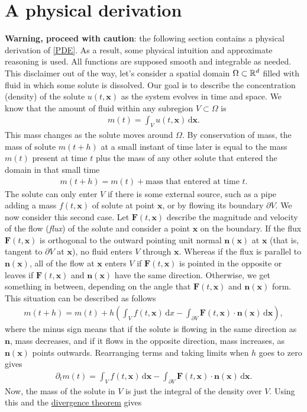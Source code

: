 \documentclass[
	a4paper,
	DIV=14,
	abstract=true,
	numbers=noenddot
]
{scrartcl}
\theoremstyle{definition}
\newcommand{\qt}[1]{\left(#1\right)}
\renewcommand{\d}{\,\mathrm{d}}\newcommand{\dx}{\,\mathrm{d}x}\newcommand{\dy}{\,\mathrm{d}y}
\begin{document}
\section{A physical derivation}
\textbf{Warning, proceed with caution}: the following section contains a physical derivation of  \eqref{PDE}. As a result, some physical intuition and approximate reasoning is used. All functions are supposed smooth and integrable as needed.
This disclaimer out of the way, let's consider a spatial domain $\Omega \subset \mathbb{R}^d$ filled with fluid in which some solute is dissolved. Our goal is to describe the concentration (density) of the solute $u(t,\bm{x}) $ as the system evolves in time and space. We know that the amount of fluid within any subregion $V \subset  \Omega$ is
\begin{align*}
	m(t)=\int_{V} u(t,\bm{x}) \d \bm{x}  .
\end{align*}
This mass changes as the solute moves around $\Omega$.	By conservation of mass, the mass of solute $m(t+h)$ at a small instant of time later is equal to the mass $m(t)$ present at time $t$ plus the mass of any other solute that entered the domain in that small time
\begin{align*}
	m(t+h)=m(t)+ \text{mass that entered at time } t .
\end{align*}
The solute can only enter $V$ if there is some external source, such as a pipe adding a mass $f(t,\bm{x})$ of solute at point $\bm{x}$, or by flowing its boundary  $\partial V$. We now consider this second case. Let $\bm{F}(t,\bm{x} ) $ describe the magnitude and velocity of the flow (\emph{flux}) of the solute and consider a point $\bm{x}$ on the boundary. If the flux $\bm{F}(t,\bm{x} )$ is orthogonal to the outward pointing unit normal $\bm{n}(\bm{x})$ at $\bm{x}$ (that is, tangent to $\partial  V$ at $\bm{x}$), no fluid enters $V$ through $\bm{x}$. Whereas if the flux is parallel to $\bm{n}(\bm{x})$, all of the flow at $\bm{x} $ enters $V$ if $\bm{F}(t,\bm{x})$ is pointed in the opposite or leaves if $\bm{F}(t,\bm{x})$ and $\bm{n}(\bm{x})$ have the same direction. Otherwise, we get something in between, depending on the angle that $\bm{F}(t,\bm{x})$ and $\bm{n}(\bm{x})$ form. This situation can be described as follows
\begin{align*}
	m(t+h)=m(t) +h \qt{ \int_{V} f(t,\bm{x} ) \dx- \int_{\partial V} \bm{F}(t, \bm{x})\cdot \bm{n}(\bm{x} )    \d  \bm{x}  },
\end{align*}
where the minus sign means that if the solute is flowing in the same direction as $\bm{n}$, mass decreases, and if it flows in the opposite direction, mass increases, as $ \bm{n}(\bm{x})$ points outwards. Rearranging terms and taking limits when $h$ goes to zero gives
\begin{align*}
	\partial _t m(t)=\int_{V}f(t,\bm{x} ) \d \bm{x}   -\int_{\partial V}  \bm{F}(t, \bm{x})\cdot \bm{n}(\bm{x} )    \d  \bm{x}  .	\end{align*}
Now, the mass of the solute in $V$ is just the integral of the density over $V$. Using this and the \href{https://en.wikipedia.org/wiki/Divergence_theorem#:~:text=%5Bedit%5D-,For,-bounded%20open%20subsets}{divergence theorem} gives
\end{document}
